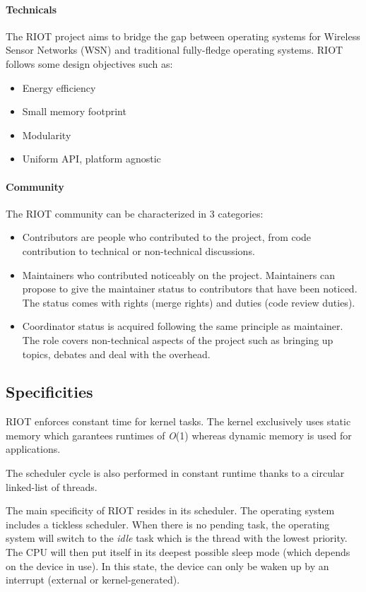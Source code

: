 \paragraph{Technicals} The RIOT project aims to bridge the gap between operating systems for Wireless Sensor Networks (WSN) and traditional fully-fledge operating systems.
RIOT follows some design objectives such as:
\begin{itemize}
    \item Energy efficiency
    \item Small memory footprint
    \item Modularity
    \item Uniform API, platform agnostic
\end{itemize}

\paragraph{Community} The RIOT community can be characterized in 3 categories\cite{RIOTComm}:
\begin{itemize}
    \item Contributors are people who contributed to the project, from code contribution to technical or non-technical discussions.
    \item Maintainers who contributed noticeably on the project.
        Maintainers can propose to give the maintainer status to contributors that have been noticed.
        The status comes with rights (merge rights) and duties (code review duties).
    \item Coordinator status is acquired following the same principle as maintainer.
        The role covers non-technical aspects of the project such as bringing up topics, debates and deal with the overhead.
\end{itemize}

\subsection{Specificities}
RIOT enforces constant time for kernel tasks.
The kernel exclusively uses static memory which garantees runtimes of \textit{O}(1) whereas dynamic memory is used for applications.

The scheduler cycle is also performed in constant runtime thanks to a circular linked-list of threads\cite{riotspec}.

The main specificity of RIOT resides in its scheduler.
The operating system includes a tickless scheduler.
When there is no pending task, the operating system will switch to the \textit{idle} task which is the thread with the lowest priority.
The CPU will then put itself in its deepest possible sleep mode (which depends on the device in use).
In this state, the device can only be waken up by an interrupt (external or kernel-generated).